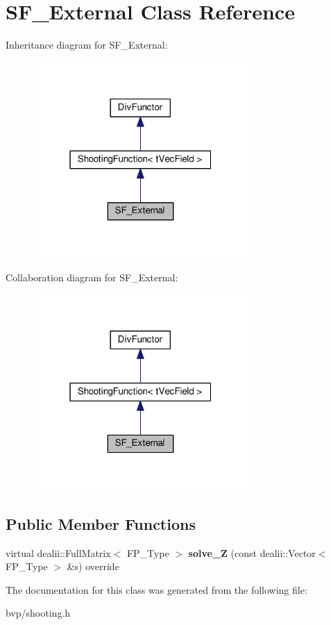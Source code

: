 \hypertarget{classSF__External}{}\section{S\+F\+\_\+\+External Class Reference}
\label{classSF__External}


Inheritance diagram for S\+F\+\_\+\+External\+:
\nopagebreak
\begin{figure}[H]
\begin{center}
\leavevmode
\includegraphics[width=232pt]{classSF__External__inherit__graph}
\end{center}
\end{figure}


Collaboration diagram for S\+F\+\_\+\+External\+:
\nopagebreak
\begin{figure}[H]
\begin{center}
\leavevmode
\includegraphics[width=232pt]{classSF__External__coll__graph}
\end{center}
\end{figure}
\subsection*{Public Member Functions}
\begin{DoxyCompactItemize}
\item 
\mbox{\label{classSF__External_a879454b3ef1b1dc338e3d1a10c82fdb6}} 
virtual dealii\+::\+Full\+Matrix$<$ F\+P\+\_\+\+Type $>$ {\bfseries solve\+\_\+Z} (const dealii\+::\+Vector$<$ F\+P\+\_\+\+Type $>$ \&s) override
\end{DoxyCompactItemize}


The documentation for this class was generated from the following file\+:\begin{DoxyCompactItemize}
\item 
bvp/shooting.\+h\end{DoxyCompactItemize}
